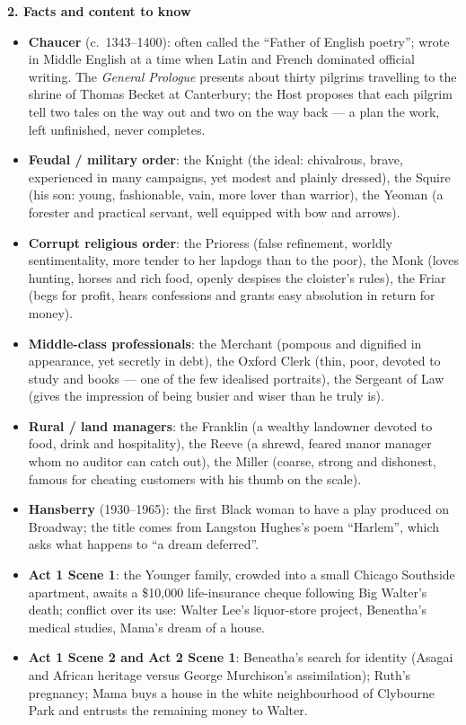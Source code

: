 \documentclass[11pt]{article}
\newcommand{\cle}[1]{{\popxbold\color{popdark}#1}}
\begin{document}
\begin{bilan}
\textbf{2. Facts and content to know}
\begin{itemize}
  \item \textbf{Chaucer} (c.\ 1343--1400): often called the ``Father of English poetry''; wrote in Middle English at a time when Latin and French dominated official writing. The \emph{General Prologue} presents about thirty pilgrims travelling to the shrine of Thomas Becket at Canterbury; the Host proposes that each pilgrim tell two tales on the way out and two on the way back --- a plan the work, left unfinished, never completes.
  \item \textbf{Feudal / military order}: the \cle{Knight} (the ideal: chivalrous, brave, experienced in many campaigns, yet modest and plainly dressed), the \cle{Squire} (his son: young, fashionable, vain, more lover than warrior), the \cle{Yeoman} (a forester and practical servant, well equipped with bow and arrows).
  \item \textbf{Corrupt religious order}: the \cle{Prioress} (false refinement, worldly sentimentality, more tender to her lapdogs than to the poor), the \cle{Monk} (loves hunting, horses and rich food, openly despises the cloister's rules), the \cle{Friar} (begs for profit, hears confessions and grants easy absolution in return for money).
  \item \textbf{Middle-class professionals}: the \cle{Merchant} (pompous and dignified in appearance, yet secretly in debt), the Oxford \cle{Clerk} (thin, poor, devoted to study and books --- one of the few idealised portraits), the \cle{Sergeant of Law} (gives the impression of being busier and wiser than he truly is).
  \item \textbf{Rural / land managers}: the \cle{Franklin} (a wealthy landowner devoted to food, drink and hospitality), the \cle{Reeve} (a shrewd, feared manor manager whom no auditor can catch out), the \cle{Miller} (coarse, strong and dishonest, famous for cheating customers with his thumb on the scale).
  \item \textbf{Hansberry} (1930--1965): the first Black woman to have a play produced on Broadway; the title comes from Langston Hughes's poem ``Harlem'', which asks what happens to ``a dream deferred''.
  \item \textbf{Act 1 Scene 1}: the Younger family, crowded into a small Chicago Southside apartment, awaits a \$10{,}000 life-insurance cheque following Big Walter's death; conflict over its use: Walter Lee's liquor-store project, Beneatha's medical studies, Mama's dream of a house.
  \item \textbf{Act 1 Scene 2 and Act 2 Scene 1}: Beneatha's search for identity (Asagai and African heritage versus George Murchison's assimilation); Ruth's pregnancy; Mama buys a house in the white neighbourhood of Clybourne Park and entrusts the remaining money to Walter.

\end{itemize}
\end{bilan}
\end{document}
